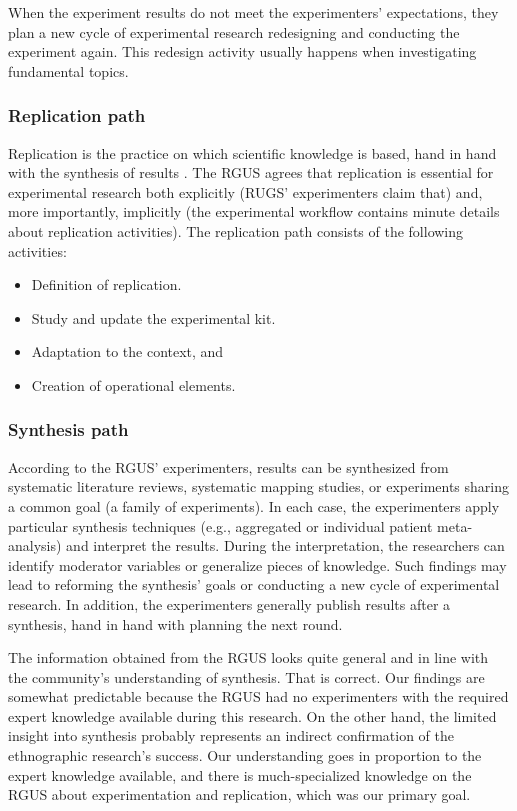 When the experiment results do not meet the experimenters' expectations, they plan a new cycle of experimental research redesigning and conducting the experiment again. This redesign activity usually happens when investigating fundamental topics.

\subsubsection{Replication path}
Replication is the practice on which scientific knowledge is based, hand in hand with the synthesis of results \cite{Roizer-2014-reproducibility}. The RGUS agrees that replication is essential for experimental research both explicitly (RUGS' experimenters claim that) and, more importantly, implicitly (the experimental workflow contains minute details about replication activities). The replication path consists of the following activities:

\begin{itemize}
	\item Definition of replication.
	\item Study and update the experimental kit.
	\item Adaptation to the context, and
	\item Creation of operational elements.
\end{itemize}

\subsubsection{Synthesis path} 
According to the RGUS' experimenters, results can be synthesized from systematic literature reviews, systematic mapping studies, or experiments sharing a common goal (a family of experiments). In each case, the experimenters apply particular synthesis techniques (e.g., aggregated or individual patient meta-analysis) and interpret the results. During the interpretation, the researchers can identify moderator variables or generalize pieces of knowledge. Such findings may lead to reforming the synthesis' goals or conducting a new cycle of experimental research. In addition, the experimenters generally publish results after a synthesis, hand in hand with planning the next round.

The information obtained from the RGUS looks quite general and in line with the community's understanding of synthesis. That is correct. Our findings are somewhat predictable because the RGUS had no experimenters with the required expert knowledge available during this research. On the other hand, the limited insight into synthesis probably represents an indirect confirmation of the ethnographic research's success. Our understanding goes in proportion to the expert knowledge available, and there is much-specialized knowledge on the RGUS about experimentation and replication, which was our primary goal. 

